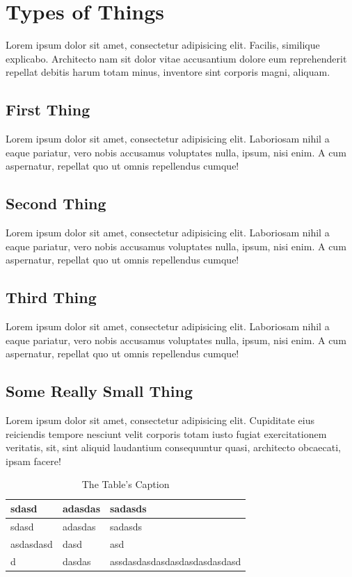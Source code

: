 \section{Types of Things}\label{types-of-things}

Lorem ipsum dolor sit amet, consectetur adipisicing elit. Facilis,
similique explicabo. Architecto nam sit dolor vitae accusantium dolore
eum reprehenderit repellat debitis harum totam minus, inventore sint
corporis magni, aliquam.

\subsection{First Thing}\label{first-thing}

Lorem ipsum dolor sit amet, consectetur adipisicing elit. Laboriosam
nihil a eaque pariatur, vero nobis accusamus voluptates nulla, ipsum,
nisi enim. A cum aspernatur, repellat quo ut omnis repellendus cumque!

\subsection{Second Thing}\label{second-thing}

Lorem ipsum dolor sit amet, consectetur adipisicing elit. Laboriosam
nihil a eaque pariatur, vero nobis accusamus voluptates nulla, ipsum,
nisi enim. A cum aspernatur, repellat quo ut omnis repellendus cumque!

\subsection{Third Thing}\label{third-thing}

Lorem ipsum dolor sit amet, consectetur adipisicing elit. Laboriosam
nihil a eaque pariatur, vero nobis accusamus voluptates nulla, ipsum,
nisi enim. A cum aspernatur, repellat quo ut omnis repellendus cumque!

\subsection{Some Really Small Thing}\label{some-really-small-thing}

Lorem ipsum dolor sit amet, consectetur adipisicing elit. Cupiditate
eius reiciendis tempore nesciunt velit corporis totam iusto fugiat
exercitationem veritatis, sit, sint aliquid laudantium consequuntur
quasi, architecto obcaecati, ipsam facere!

\begin{longtable}[]{@{}lll@{}}
\caption{The Table's Caption}\tabularnewline
\toprule
sdasd & adasdas & sadasds\tabularnewline
\midrule
\endfirsthead
\toprule
sdasd & adasdas & sadasds\tabularnewline
\midrule
\endhead
asdasdasd & dasd & asd\tabularnewline
d & dasdas & assdasdasdasdasdasdasdasdasd\tabularnewline
\bottomrule
\end{longtable}

